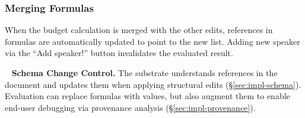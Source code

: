 \documentclass[sigconf,anonymous,screen]{acmart}
\newcommand*\circled[1]{\textnormal{\footnotesize\sffamily\bfseries\protect\tikz[baseline=(char.base)]{
  \node[shape=circle,fill=black,text=white,draw,inner sep=1pt] (char) {#1};}}}
\DeclareRobustCommand{\keyideabox}[3]{\begin{tcolorbox}[breakable,
  boxsep=5pt,left=0pt,right=0pt,top=0pt,bottom=0pt,width=\dimexpr\columnwidth\relax,
  colback=gray!20,colframe=gray!20,
  enlarge bottom by=0pt,enlarge top by=0pt,
  arc=0pt,outer arc=0pt]
\lettrine[lraise=0.3]{\LARGE #1}{~}
\small \textbf{#2.} #3
\end{tcolorbox}
}
\begin{document}
\subsubsection*{\circled{G} Merging Formulas} When the budget calculation is merged with the
other edits, references in formulas are automatically updated to point to the new list.
Adding new speaker via the ``Add speaker!'' button invalidates the evaluated result.

\keyideabox{\faLightbulbO}{Schema Change Control}{The substrate understands references in
the document and updates them when applying structural edits (\S\ref{sec:impl-schema}).
Evaluation can replace formulas with values, but also augment them to enable
end-user debugging via provenance analysis (\S\ref{sec:impl-provenance}).}


\end{document}
